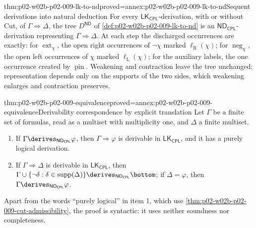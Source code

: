 \begin{hbtheorem}{thm:p02-w02b-p02-009-lk-to-nd}{proved=annex:p02-w02b-p02-009-lk-to-nd}{Sequent derivations into natural deduction}
For every \(\mathsf{LK}_{\mathsf{CPL}}\)-derivation, with or without Cut, of
\(\Gamma\Rightarrow\Delta\), the tree \(D^{\mathsf{ND}}\) of
\cref{def:p02-w02b-p02-009-lk-to-nd} is an
\(\mathsf{ND}_{\mathsf{CPL}}\)-derivation representing
\(\Gamma\Rightarrow\Delta\).  At each step the discharged occurrences are
exactly: for \(\operatorname{ext}_\chi\), the open right occurrences of
\(\neg\chi\) marked \(\ell_{\mathrm R}(\chi)\); for
\(\operatorname{neg}_\chi\), the open left occurrences of \(\chi\) marked
\(\ell_{\mathrm L}(\chi)\); for the auxiliary labels, the one occurrence
created by \(\operatorname{pin}\).  Weakening and contraction leave the tree
unchanged: representation depends only on the supports of the two sides,
which weakening enlarges and contraction preserves.
\end{hbtheorem}

\begin{hbcorollary}{thm:p02-w02b-p02-009-equivalence}{proved=annex:p02-w02b-p02-009-equivalence}{Derivability correspondence by explicit translation}
Let \(\Gamma\) be a finite set of formulas, read as a multiset with
multiplicity one, and \(\Delta\) a finite multiset.
\begin{enumerate}
  \item If \(\Gamma\derives_{\mathsf{ND}_{\mathsf{CPL}}}\varphi\), then
    \(\Gamma\Rightarrow\varphi\) is derivable in \(\mathsf{LK}_{\mathsf{CPL}}\),
    and it has a purely logical derivation.
  \item If \(\Gamma\Rightarrow\Delta\) is derivable in
    \(\mathsf{LK}_{\mathsf{CPL}}\), then
    \(\Gamma\cup\{\neg\delta:\delta\in\operatorname{supp}(\Delta)\}
    \derives_{\mathsf{ND}_{\mathsf{CPL}}}\bottom\); if \(\Delta=\varphi\), then
    \(\Gamma\derives_{\mathsf{ND}_{\mathsf{CPL}}}\varphi\).
\end{enumerate}
Apart from the words ``purely logical'' in item 1, which use
\cref{thm:p02-w02b-p02-009-cut-admissibility}, the proof is syntactic: it
uses neither soundness nor completeness.
\end{hbcorollary}

